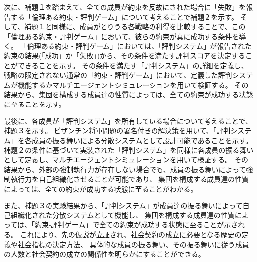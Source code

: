 次に、補題１を踏まえて、全ての成員が約束を反故にされた場合に「失敗」を報告する「倫理ある約束・評判ゲーム」について考えることで補題２を示す。
そして、補題１と同様に、成員がとりうる各戦略の利得を比較することで、この「倫理ある約束・評判ゲーム」において、彼らの約束が真に成功する条件を導く。
「倫理ある約束・評判ゲーム」においては、「評判システム」が報告された約束の結果(「成功」か「失敗」)から、その条件を満たす評判スコアを決定することができることを示す。
その条件を満たす「評判システム」の詳細を定義し、
戦略の限定されない通常の「約束・評判ゲーム」において、定義した評判システムが機能するかマルチエージェントシミュレーションを用いて検証する。
その結果から、集団を構成する成員達の性質によっては、全ての約束が成功する状態に至ることを示す。

最後に、各成員が「評判システム」を所有している場合について考えることで、補題３を示す。
ビザンチン将軍問題の署名付きの解決策を用いて、「評判システム」を各成員の振る舞いによる分散システムとして設計可能であることを示す。
補題２の条件に基づいて実装された「評判システム」を同様に各成員の振る舞いとして定義し、マルチエージェントシミュレーションを用いて検証する。
その結果から、外部の強制執行力が存在しない場合でも、成員の振る舞いによって強制執行力を自己組織化させることが可能であり、
集団を構成する成員達の性質によっては、全ての約束が成功する状態に至ることがわかる。

また、補題３の実験結果から、「評判システム」が成員達の振る舞いによって自己組織化された分散システムとして機能し、
集団を構成する成員達の性質によっては、「約束-評判ゲーム」で全ての約束が成功する状態に至ることが示される。
これにより、先の仮説が立証され、社会契約の成立に必要となる歴史の定義や社会指標の決定方法、
具体的な成員の振る舞い、その振る舞いに従う成員の人数と社会契約の成立の関係性を明らかにすることができる。

